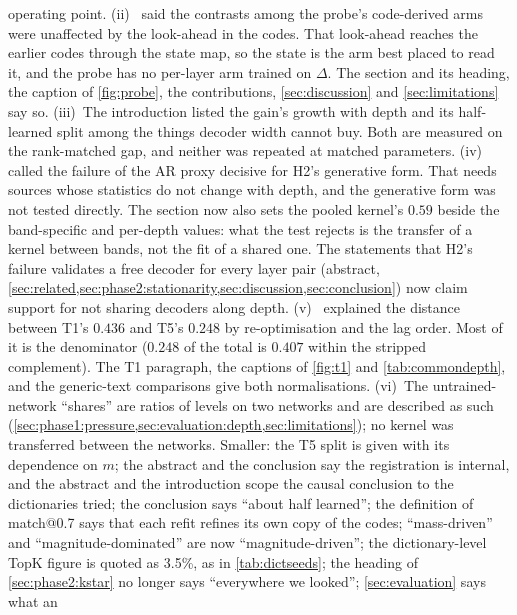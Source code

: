 \begin{itemize}
    operating point.
    (ii)~ said the contrasts among the probe's
    code-derived arms were unaffected by the look-ahead in the codes. That
    look-ahead reaches the earlier codes through the state map, so the state
    is the arm best placed to read it, and the probe has no per-layer arm
    trained on $\Delta$. The section and its heading, the caption of
    \cref{fig:probe}, the contributions, \cref{sec:discussion} and
    \cref{sec:limitations} say so.
    (iii)~The introduction listed the gain's growth with depth and its
    half-learned split among the things decoder width cannot buy. Both are
    measured on the rank-matched gap, and neither was repeated at matched
    parameters.
    (iv)~ called the failure of the AR proxy
    decisive for H2's generative form. That needs sources whose statistics
    do not change with depth, and the generative form was not tested
    directly. The section now also sets the pooled kernel's $0.59$ beside
    the band-specific and per-depth values: what the test rejects is the
    transfer of a kernel between bands, not the fit of a shared one. The
    statements that H2's failure validates a free decoder for every layer
    pair (abstract, \cref{sec:related,sec:phase2:stationarity,sec:discussion,sec:conclusion})
    now claim support for not sharing decoders along depth.
    (v)~ explained the distance between T1's
    $0.436$ and T5's $0.248$ by re-optimisation and the lag order. Most of
    it is the denominator ($0.248$ of the total is $0.407$ within the
    stripped complement). The T1 paragraph, the captions of \cref{fig:t1}
    and \cref{tab:commondepth}, and the generic-text comparisons give both
    normalisations.
    (vi)~The untrained-network ``shares'' are ratios of levels on two
    networks and are described as such
    (\cref{sec:phase1:pressure,sec:evaluation:depth,sec:limitations}); no
    kernel was transferred between the networks.
    Smaller: the T5 split is given with its dependence on $m$; the abstract
    and the conclusion say the registration is internal, and the abstract
    and the introduction scope the causal conclusion to the dictionaries
    tried; the conclusion says ``about half learned''; the definition of
    match@0.7 says that each refit refines its own copy of the codes;
    ``mass-driven'' and ``magnitude-dominated'' are now ``magnitude-driven'';
    the dictionary-level TopK figure is quoted as 3.5\%, as in
    \cref{tab:dictseeds}; the heading of \cref{sec:phase2:kstar} no longer
    says ``everywhere we looked''; \cref{sec:evaluation} says what an

\end{itemize}
